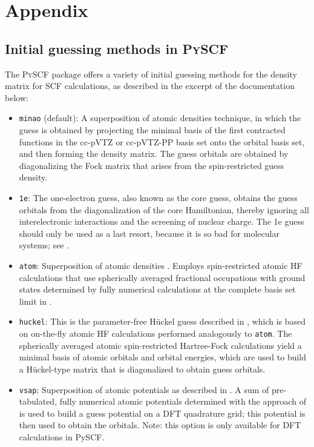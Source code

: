 \appendix
\chapter{Appendix}
\label{sec:appendix}

\section{Initial guessing methods in \textsc{PySCF} \parencite{ref:pyscf}}
\label{sec:pyscf_initial_guessing_methods}
The \textsc{PySCF} package offers a variety of initial guessing methods for the density matrix for SCF calculations, as described in the excerpt of the documentation \parencite{ref:pyscf_user_guide} below: 
\begin{itemize}
    \item \texttt{minao} (default): A superposition of atomic densities \parencite{ref:minao_sad1,ref:minao_sad2} technique, in which the guess is obtained by projecting the minimal basis of the first contracted functions in the cc-pVTZ or cc-pVTZ-PP basis set onto the orbital basis set, and then forming the density matrix. The guess orbitals are obtained by diagonalizing the Fock matrix that arises from the spin-restricted guess density.

    \item \texttt{1e}: The one-electron guess, also known as the core guess, obtains the guess orbitals from the diagonalization of the core Hamiltonian, thereby ignoring all interelectronic interactions and the screening of nuclear charge. The 1e guess should only be used as a last resort, because it is so bad for molecular systems; see \parencite{ref:Lehtola2019}.

    \item \texttt{atom}: Superposition of atomic densities \parencite{ref:minao_sad1,ref:minao_sad2}. Employs spin-restricted atomic HF calculations that use spherically averaged fractional occupations with ground states determined by fully numerical calculations at the complete basis set limit in \parencite{ref:lethola_fully_numerical_atomic_potentials}.

    \item \texttt{huckel}: This is the parameter-free Hückel guess described in \parencite{ref:Lehtola2019}, which is based on on-the-fly atomic HF calculations performed analogously to \texttt{atom}. The spherically averaged atomic spin-restricted Hartree-Fock calculations yield a minimal basis of atomic orbitals and orbital energies, which are used to build a Hückel-type matrix that is diagonalized to obtain guess orbitals.

    \item \texttt{vsap}: Superposition of atomic potentials as described in \parencite{ref:Lehtola2019}. A sum of pre-tabulated, fully numerical atomic potentials determined with the approach of \parencite{ref:lethola_fully_numerical_atomic_potentials} is used to build a guess potential on a DFT quadrature grid; this potential is then used to obtain the orbitals. Note: this option is only available for DFT calculations in PySCF.
\end{itemize}
